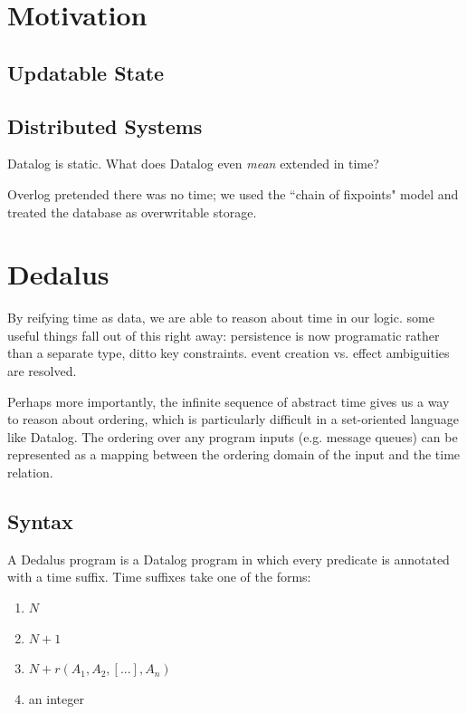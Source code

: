 \documentclass{acm_proc_article-sp-sigmod09}
\begin{document}
\section{Motivation}

\subsection{Updatable State}



\subsection{Distributed Systems}

Datalog is static.  What does Datalog even \emph{mean} extended in time?

Overlog pretended there was no time; we used the ``chain of fixpoints" model and treated the database as overwritable storage. 

\section{Dedalus}

By reifying time as data, we are able to reason about time in our logic.  some useful things fall out of this right away: persistence is now programatic rather than a separate type, ditto key constraints.  event creation vs. effect ambiguities are resolved.

Perhaps more importantly, the infinite sequence of abstract time gives us a way to reason about ordering, which is particularly difficult in a set-oriented language like Datalog.  The ordering over any program inputs (e.g. message queues) can be represented as a mapping between the ordering domain of the input and the time relation.

\subsection{Syntax}

A Dedalus program is a Datalog program in which every predicate is annotated with a time suffix. Time suffixes take one of the forms:

\begin{enumerate}
\item $N$
\item $N + 1$
\item $N + r(A_{1}, A_{2}, [...], A_{n})$
\item an integer
\end{enumerate}
\end{document}
